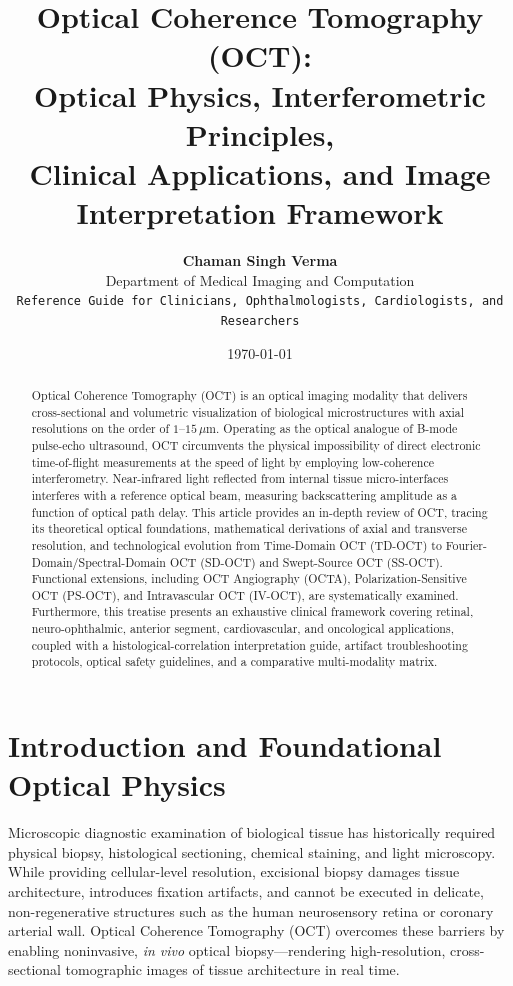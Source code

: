 \documentclass[11pt,a4paper]{article}
\title{\textbf{\huge Optical Coherence Tomography (OCT):}\\[0.3em]
\Large Optical Physics, Interferometric Principles,\\
Clinical Applications, and Image Interpretation Framework}
\author{\textbf{Chaman Singh Verma}\\[0.2em]
\small Department of Medical Imaging and Computation\\
\small \texttt{Reference Guide for Clinicians, Ophthalmologists, Cardiologists, and Researchers}}
\date{\today}
\begin{document}
\maketitle

\begin{abstract}
Optical Coherence Tomography (OCT) is an optical imaging modality that delivers cross-sectional and volumetric visualization of biological microstructures with axial resolutions on the order of $1\text{--}15\,\mu\text{m}$. Operating as the optical analogue of B-mode pulse-echo ultrasound, OCT circumvents the physical impossibility of direct electronic time-of-flight measurements at the speed of light by employing low-coherence interferometry. Near-infrared light reflected from internal tissue micro-interfaces interferes with a reference optical beam, measuring backscattering amplitude as a function of optical path delay. This article provides an in-depth review of OCT, tracing its theoretical optical foundations, mathematical derivations of axial and transverse resolution, and technological evolution from Time-Domain OCT (TD-OCT) to Fourier-Domain/Spectral-Domain OCT (SD-OCT) and Swept-Source OCT (SS-OCT). Functional extensions, including OCT Angiography (OCTA), Polarization-Sensitive OCT (PS-OCT), and Intravascular OCT (IV-OCT), are systematically examined. Furthermore, this treatise presents an exhaustive clinical framework covering retinal, neuro-ophthalmic, anterior segment, cardiovascular, and oncological applications, coupled with a histological-correlation interpretation guide, artifact troubleshooting protocols, optical safety guidelines, and a comparative multi-modality matrix.
\end{abstract}

\tableofcontents
\newpage

\section{Introduction and Foundational Optical Physics}

Microscopic diagnostic examination of biological tissue has historically required physical biopsy, histological sectioning, chemical staining, and light microscopy. While providing cellular-level resolution, excisional biopsy damages tissue architecture, introduces fixation artifacts, and cannot be executed in delicate, non-regenerative structures such as the human neurosensory retina or coronary arterial wall. Optical Coherence Tomography (OCT) overcomes these barriers by enabling noninvasive, \textit{in vivo} optical biopsy—rendering high-resolution, cross-sectional tomographic images of tissue architecture in real time.
\end{document}
